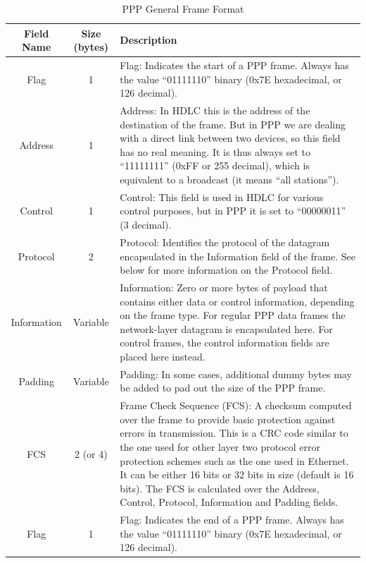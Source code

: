 \documentclass[a4paper]{report}
\begin{document}
\begin{table}[htbp]
  \centering
    \begin{tabularx}{\textwidth}{|c|c|X|}
      \hline
    Field Name & Size (bytes) & Description \\
    \hline
    Flag  & 1     & Flag: Indicates the start of a PPP frame. Always has the value “01111110” binary (0x7E hexadecimal, or 126 decimal). \\
    \hline
    Address & 1     & Address: In HDLC this is the address of the destination of the frame. But in PPP we are dealing with a direct link between two devices, so this field has no real meaning. It is thus always set to “11111111” (0xFF or 255 decimal), which is equivalent to a broadcast (it means “all stations”). \\
    \hline
    Control & 1     & Control: This field is used in HDLC for various control purposes, but in PPP it is set to “00000011” (3 decimal). \\
    \hline
    Protocol & 2     & Protocol: Identifies the protocol of the datagram encapsulated in the Information field of the frame. See below for more information on the Protocol field. \\
    \hline
    Information & Variable & Information: Zero or more bytes of payload that contains either data or control information, depending on the frame type. For regular PPP data frames the network-layer datagram is encapsulated here. For control frames, the control information fields are placed here instead. \\
    \hline
    Padding & Variable & Padding: In some cases, additional dummy bytes may be added to pad out the size of the PPP frame. \\
    \hline
    FCS   & 2 (or 4) & Frame Check Sequence (FCS): A checksum computed over the frame to provide basic protection against errors in transmission. This is a CRC code similar to the one used for other layer two protocol error protection schemes such as the one used in Ethernet. It can be either 16 bits or 32 bits in size (default is 16 bits). \newline The FCS is calculated over the Address, Control, Protocol, Information and Padding fields. \\
    \hline
    Flag  & 1     & Flag: Indicates the end of a PPP frame. Always has the value “01111110” binary (0x7E hexadecimal, or 126 decimal). \\
    \hline
    \end{tabularx}%
  \caption{ PPP General Frame Format}
\end{table}%
\end{document}
